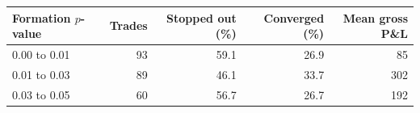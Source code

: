 \begin{tabular}{@{}lrrrr@{}}
\toprule
Formation $p$-value & Trades & Stopped out (\%) & Converged (\%) & Mean gross P\&L \\
\midrule
0.00 to 0.01 & 93 & 59.1 & 26.9 & 85 \\
0.01 to 0.03 & 89 & 46.1 & 33.7 & 302 \\
0.03 to 0.05 & 60 & 56.7 & 26.7 & 192 \\
\bottomrule
\end{tabular}
